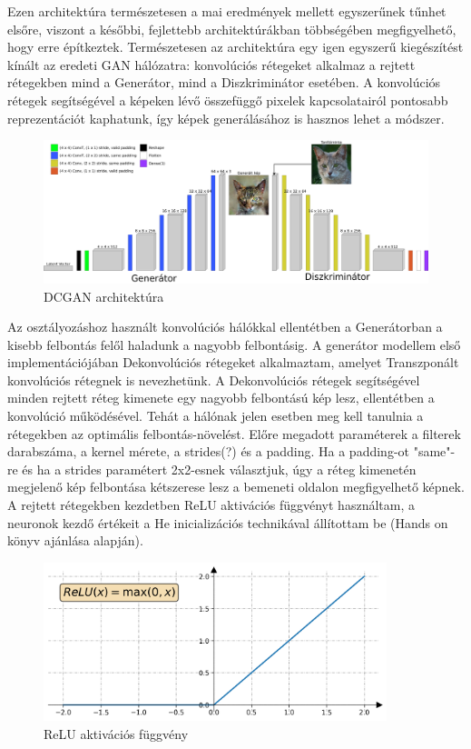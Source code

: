 
Ezen architektúra természetesen a mai eredmények mellett egyszerűnek tűnhet elsőre, viszont a későbbi, fejlettebb architektúrákban többségében megfigyelhető, hogy erre építkeztek. Természetesen az architektúra egy igen egyszerű kiegészítést kínált az eredeti GAN hálózatra: konvolúciós rétegeket alkalmaz a rejtett rétegekben mind a Generátor, mind a Diszkriminátor esetében. A konvolúciós rétegek segítségével a képeken lévő összefüggő pixelek kapcsolatairól pontosabb reprezentációt kaphatunk, így képek generálásához is hasznos lehet a módszer.

\begin{figure}[h]
\centering
\includegraphics[width=15cm]{images/DCGAN.png}
\caption{DCGAN architektúra}
\label{fig:dcgan}
\end{figure}


Az osztályozáshoz használt konvolúciós hálókkal ellentétben a Generátorban a kisebb felbontás felől haladunk a nagyobb felbontásig.
A generátor modellem első implementációjában Dekonvolúciós rétegeket alkalmaztam, amelyet Transzponált konvolúciós rétegnek is nevezhetünk. A Dekonvolúciós rétegek segítségével minden rejtett réteg kimenete egy nagyobb felbontású kép lesz, ellentétben a konvolúció működésével. Tehát a hálónak jelen esetben meg kell tanulnia a rétegekben az optimális felbontás-növelést. Előre megadott paraméterek a filterek darabszáma, a kernel mérete, a strides(?) és a padding. Ha a padding-ot "same"-re és ha a strides paramétert 2x2-esnek választjuk, úgy a réteg kimenetén megjelenő kép felbontása kétszerese lesz a bemeneti oldalon megfigyelhető képnek. A rejtett rétegekben kezdetben ReLU aktivációs függvényt használtam, a neuronok kezdő értékeit a He inicializációs technikával állítottam be (Hands on könyv ajánlása alapján).

\begin{figure}[h]
\centering
\includegraphics[width=10cm]{images/relu.png}
\caption{ReLU aktivációs függvény}
\label{fig:relu}
\end{figure}

